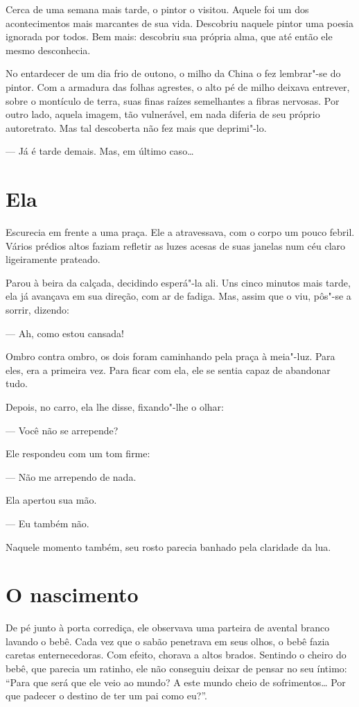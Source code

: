 Cerca de uma semana mais tarde, o pintor o visitou. Aquele foi um dos
acontecimentos mais marcantes de sua vida. Descobriu naquele pintor uma
poesia ignorada por todos. Bem mais: descobriu sua própria alma, que
até então ele mesmo desconhecia.

No entardecer de um dia frio de outono, o milho da China o fez
lembrar"-se do pintor. Com a armadura das folhas agrestes, o alto pé de
milho deixava entrever, sobre o montículo de terra, suas finas raízes
semelhantes a fibras nervosas. Por outro lado, aquela imagem, tão
vulnerável, em nada diferia de seu próprio autoretrato. Mas tal
descoberta não fez mais que deprimi"-lo.

--- Já é tarde demais. Mas, em último caso\ldots{}

\section{Ela}

Escurecia em frente a uma praça. Ele a atravessava, com o corpo um pouco
febril. Vários prédios altos faziam refletir as luzes acesas de suas
janelas num céu claro ligeiramente prateado.

Parou à beira da calçada, decidindo esperá"-la ali. Uns cinco minutos
mais tarde, ela já avançava em sua direção, com ar de fadiga. Mas,
assim que o viu, pôs"-se a sorrir, dizendo:

--- Ah, como estou cansada!

Ombro contra ombro, os dois foram caminhando pela praça à meia"-luz. Para
eles, era a primeira vez. Para ficar com ela, ele se sentia capaz de
abandonar tudo.

Depois, no carro, ela lhe disse, fixando"-lhe o olhar:

 --- Você não se arrepende?

Ele respondeu com um tom firme:

--- Não me arrependo de nada.

Ela apertou sua mão.

--- Eu também não.

Naquele momento também, seu rosto parecia banhado pela claridade da lua.

\section{O nascimento}

De pé junto à porta corrediça, ele observava uma parteira de avental
branco lavando o bebê. Cada vez que o sabão penetrava em seus olhos, o
bebê fazia caretas enternecedoras. Com efeito, chorava a altos brados.
Sentindo o cheiro do bebê, que parecia um ratinho, ele não conseguiu
deixar de pensar no seu íntimo: ``Para que será que ele veio ao mundo? A
este mundo cheio de sofrimentos\ldots{} Por que padecer o destino de ter um
pai como eu?''.

